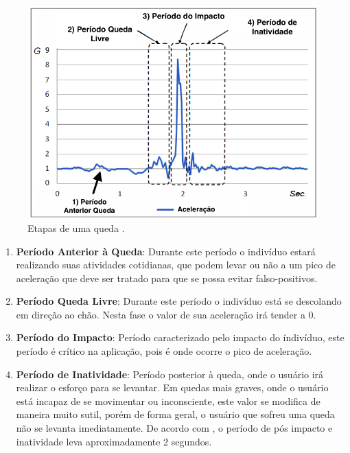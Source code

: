 \begin{figure}[ht]
	\centering
	\includegraphics[width=.8\textwidth]{imagens/fall_states.png}
	\caption{Etapas de uma queda \citep{hsieh2014wrist}.}
	\label{fig:fall_states}
\end{figure} 


\begin{enumerate}

	
	\item{\textbf{Período Anterior à Queda}: Durante este período o indivíduo estará realizando suas atividades cotidianas, que podem levar ou não a um pico de aceleração que deve ser tratado para que se possa evitar falso-positivos. }
	
	\item{\textbf{Período Queda Livre}: Durante este período o indivíduo está se descolando em direção ao chão. Nesta fase o valor de sua aceleração irá tender a 0.  }
	
	\item{\textbf{Período do Impacto}: Período caracterizado pelo impacto do índivíduo, este período é crítico na aplicação, pois é onde ocorre o pico de aceleração. }
	
	\item{\textbf{Período de Inatividade}: Período posterior à queda, onde o usuário irá realizar o esforço para se levantar. Em quedas mais graves, onde o usuário está incapaz de se movimentar ou inconsciente, este valor se modifica de maneira muito sutil, porém de forma geral, o usuário que sofreu uma queda não se levanta imediatamente. De acordo com \cite{mehner2013location}, o período de pós impacto e inatividade leva aproximadamente 2 segundos.  }
	
\end{enumerate}



